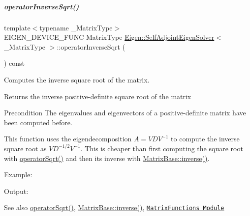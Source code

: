 \mbox{\label{group___eigenvalues___module_a71fe0aea0b22d176efcea556c5c160f5}} 
\subparagraph{\texorpdfstring{operator\+Inverse\+Sqrt()}{operatorInverseSqrt()}\hspace{0.1cm}{\footnotesize\ttfamily [1/2]}}
{\footnotesize\ttfamily template$<$typename \+\_\+\+Matrix\+Type$>$ \\
E\+I\+G\+E\+N\+\_\+\+D\+E\+V\+I\+C\+E\+\_\+\+F\+U\+NC Matrix\+Type \hyperlink{group___eigenvalues___module_class_eigen_1_1_self_adjoint_eigen_solver}{Eigen\+::\+Self\+Adjoint\+Eigen\+Solver}$<$ \+\_\+\+Matrix\+Type $>$\+::operator\+Inverse\+Sqrt (\begin{DoxyParamCaption}{ }\end{DoxyParamCaption}) const\hspace{0.3cm}{\ttfamily [inline]}}



Computes the inverse square root of the matrix. 

\begin{DoxyReturn}{Returns}
the inverse positive-\/definite square root of the matrix
\end{DoxyReturn}
\begin{DoxyPrecond}{Precondition}
The eigenvalues and eigenvectors of a positive-\/definite matrix have been computed before.
\end{DoxyPrecond}
This function uses the eigendecomposition $ A = V D V^{-1} $ to compute the inverse square root as $ V D^{-1/2} V^{-1} $. This is cheaper than first computing the square root with \hyperlink{group___eigenvalues___module_a5c5158fd86366081bdabec38112c2c8a}{operator\+Sqrt()} and then its inverse with \hyperlink{group___core___module_a7712eb69e8ea3c8f7b8da1c44dbdeebf}{Matrix\+Base\+::inverse()}.

Example\+: 
\begin{DoxyCodeInclude}
\end{DoxyCodeInclude}
 Output\+: 
\begin{DoxyVerbInclude}
\end{DoxyVerbInclude}


\begin{DoxySeeAlso}{See also}
\hyperlink{group___eigenvalues___module_a5c5158fd86366081bdabec38112c2c8a}{operator\+Sqrt()}, \hyperlink{group___core___module_a7712eb69e8ea3c8f7b8da1c44dbdeebf}{Matrix\+Base\+::inverse()}, \href{unsupported/group__MatrixFunctions__Module.html}{\tt Matrix\+Functions Module} 
\end{DoxySeeAlso}


